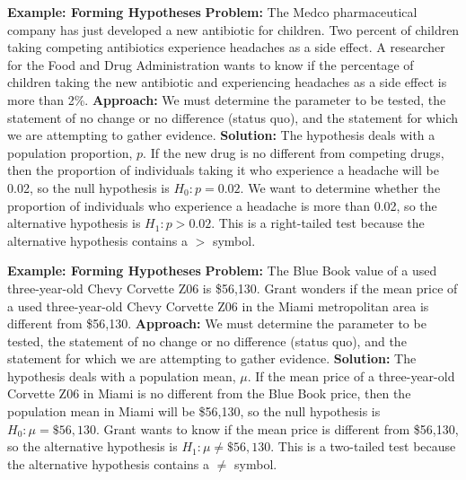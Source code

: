 \documentclass{report}
\begin{document}
    \pagebreak \bigbreak \noindent 
    \begin{mdframed}
      \textbf{Example: Forming Hypotheses}
      \bigbreak \noindent 
      \textbf{Problem:}
      The Medco pharmaceutical company has just developed a new antibiotic for children. Two percent of children taking competing antibiotics experience headaches as a side effect. A researcher for the Food and Drug Administration wants to know if the percentage of children taking the new antibiotic and experiencing headaches as a side effect is more than 2\%.
      \bigbreak \noindent 
      \textbf{Approach:}
      We must determine the parameter to be tested, the statement of no change or no difference (status quo), and the statement for which we are attempting to gather evidence.
      \bigbreak \noindent 
      \textbf{Solution:}
      \bigbreak \noindent 
      The hypothesis deals with a population proportion, \(p\). If the new drug is no different from competing drugs, then the proportion of individuals taking it who experience a headache will be 0.02, so the null hypothesis is \(H_0: p = 0.02\). We want to determine whether the proportion of individuals who experience a headache is more than 0.02, so the alternative hypothesis is \(H_1: p > 0.02\). This is a right-tailed test because the alternative hypothesis contains a \(>\) symbol.
    \end{mdframed}

    \bigbreak \noindent 
    \begin{mdframed}
      \textbf{Example: Forming Hypotheses}
      \bigbreak \noindent 
      \textbf{Problem:}
      The Blue Book value of a used three-year-old Chevy Corvette Z06 is \$56,130. Grant wonders if the mean price of a used three-year-old Chevy Corvette Z06 in the Miami metropolitan area is different from \$56,130.
      \bigbreak \noindent 
      \textbf{Approach:}
      We must determine the parameter to be tested, the statement of no change or no difference (status quo), and the statement for which we are attempting to gather evidence.
      \bigbreak \noindent 
      \textbf{Solution:}
      \bigbreak \noindent 
      The hypothesis deals with a population mean, \(\mu\). If the mean price of a three-year-old Corvette Z06 in Miami is no different from the Blue Book price, then the population mean in Miami will be \$56,130, so the null hypothesis is \(H_0: \mu = \$56,130\). Grant wants to know if the mean price is different from \$56,130, so the alternative hypothesis is \(H_1: \mu \neq \$56,130\). This is a two-tailed test because the alternative hypothesis contains a \(\neq\) symbol.
    \end{mdframed}
\end{document}
